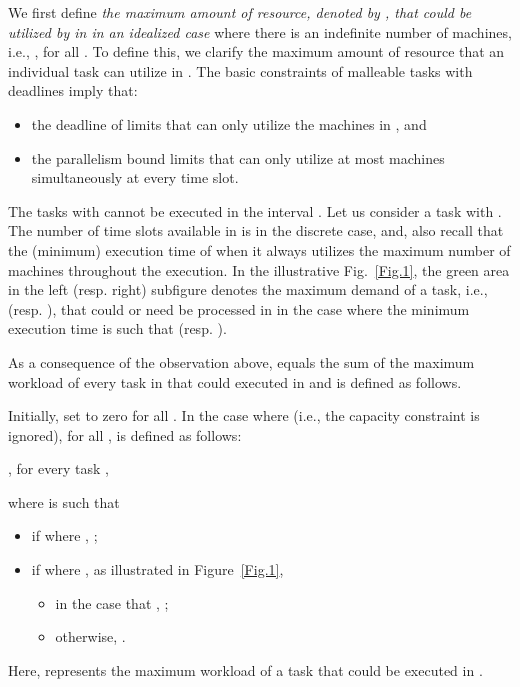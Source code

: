 \documentclass[10pt,journal,compsoc]{IEEEtran}
\begin{document}
We first define {\em the maximum amount of resource, denoted by , that could be utilized by  in  in an idealized case} where there is an indefinite number of machines, i.e., , for all . To define this, we clarify the maximum amount of resource that an individual task  can utilize in . The basic constraints of malleable tasks with deadlines imply that:
\begin{itemize}
\item the deadline of  limits that  can only utilize the machines in , and

\item the parallelism bound limits that  can only utilize at most  machines simultaneously at every time slot.
\end{itemize}
The tasks with  cannot be executed in the interval . Let us consider a task  with . The number of time slots available in  is  in the discrete case, and, also recall that  the (minimum) execution time of  when it always utilizes the maximum number  of machines throughout the execution. In the illustrative Fig.~\ref{Fig.1}, the green area in the left (resp. right) subfigure denotes the maximum demand of a task, i.e.,  (resp. ), that could or need be processed in  in the case where the minimum execution time is such that  (resp. ).

As a consequence of the observation above,  equals the sum of the maximum workload of every task in  that could executed in  and is defined as follows.
\begin{definition}\label{Def-1}
Initially, set  to zero for all . In the case where  (i.e., the capacity constraint is ignored), for all ,  is defined as follows:
\begin{center}
, for every task ,
\end{center}
where  is such that
\begin{itemize}
  \setlength\itemsep{0.2em}


\item if  where , ;

\item if  where , as illustrated in Figure~\ref{Fig.1},

\begin{itemize}
  \setlength\itemsep{0.25em}
\item in the case that , ;

\item otherwise, .
\end{itemize}
\end{itemize}
Here,  represents the maximum workload of a task  that could be executed in .
\end{definition}
\end{document}
